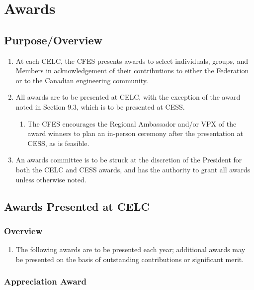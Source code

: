 \section{Awards}
\label{awards}

\subsection{Purpose/Overview}
\label{purposeoverview}

\begin{enumerate}
 \item
  At each CELC, the CFES presents awards to select individuals, groups, and Members in acknowledgement of their contributions to either the Federation or to the Canadian engineering community.
 \item
  All awards are to be presented at CELC, with the exception of the award noted in Section 9.3, which is to be presented at CESS.

  \begin{enumerate}
   \item
    The CFES encourages the Regional Ambassador and/or VPX of the award winners to plan an in-person ceremony after the presentation at CESS, as is feasible.
  \end{enumerate}

 \item
  An awards committee is to be struck at the discretion of the President for both the CELC and CESS awards, and has the authority to grant all awards unless otherwise noted.
\end{enumerate}

\subsection{Awards Presented at CELC}
\label{awards-presented-at-celc}

\subsubsection{Overview}
\label{overview}

\begin{enumerate}
 \item
  The following awards are to be presented each year; additional awards may be presented on the basis of outstanding contributions or significant merit.
\end{enumerate}

\subsubsection{Appreciation Award}
\label{appreciation-award}


